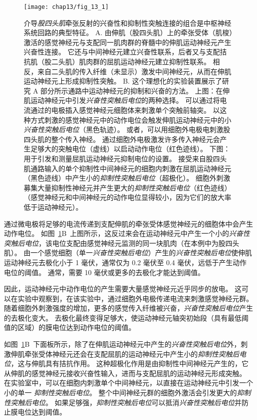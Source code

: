 \begin{figure}[htbp]
	\centering
	\texttt{[image: chap13/fig\_13\_1]}
	\caption{介导\textit{股四头肌}牵张反射的兴奋性和抑制性突触连接的组合是中枢神经系统回路的典型特征。
		A. 由伸肌（股四头肌）上的牵张受体（肌梭）激活的感觉神经元与支配同一肌肉群的脊髓中的伸肌运动神经元产生兴奋性连接。
		它还与中间神经元建立兴奋性联系，后者又与支配拮抗肌（股二头肌）肌肉群的屈肌运动神经元建立抑制性联系。
		相反，来自二头肌的传入纤维（未显示）激发中间神经元，从而在伸肌运动神经元上形成抑制性突触。
		B. 这个理想化的实验装置展示了研究 A 部分所示通路中运动神经元的抑制和兴奋的方法。
		上图：在伸肌运动神经元中引发\textit{兴奋性突触后电位}的两种选择。
		可以通过将电流通过的电极插入感觉神经元细胞体来刺激单个突触前轴突。
		以这种方式刺激的感觉神经元中的动作电位会触发伸肌运动神经元中的小\textit{兴奋性突触后电位}（黑色轨迹）。
		或者，可以用细胞外电极电刺激股四头肌的整个传入神经。
		通过细胞外电极激发许多传入神经元会产生足够大的突触电位（虚线）以启动动作电位（红色迹线）。
		下图：用于引发和测量屈肌运动神经元抑制电位的设置。
		接受来自股四头肌通路输入的单个抑制性中间神经元的细胞内刺激在屈肌运动神经元（黑色迹线）中产生小的\textit{抑制性突触后电位}（超极化）。
		细胞外刺激募集大量抑制性神经元并产生更大的\textit{抑制性突触后电位}（红色迹线）
		（感觉神经元和中间神经元的动作电位显得较小，因为它们的放大率低于运动神经元）。}
	\label{fig:13_1}
\end{figure}


通过微电极将足够的电流传递到支配伸肌的牵张受体感觉神经元的细胞体中会产生动作电位。
如图~\ref{fig:13_1}B~上图所示，这反过来会在运动神经元中产生一个小的\textit{兴奋性突触后电位}，该电位支配由感觉神经元监测的同一块肌肉（在本例中为股四头肌）。
由一个感觉细胞（单一\textit{兴奋性突触后电位}）产生的\textit{兴奋性突触后电位}使伸肌运动神经元去极化小于 1 毫伏，通常仅为 0.2 毫伏至 0.4 毫伏，远低于产生动作电位的阈值。
通常，需要 10 毫伏或更多的去极化才能达到阈值。


因此，运动神经元中动作电位的产生需要大量感觉神经元近乎同步的放电。
这可以在实验中观察到，在该实验中，通过细胞外电极传递电流来刺激感觉神经元群。
随着细胞外刺激强度的增加，更多的感觉传入纤维被兴奋，\textit{兴奋性突触后电位}产生的去极化变大。
去极化最终变得足够大，使运动神经元轴突初始段（具有最低阈值的区域）的膜电位达到动作电位的阈值。


如图~\ref{fig:13_1}B~下面板所示，除了在伸肌运动神经元中产生的\textit{兴奋性突触后电位}外，刺激伸肌牵张受体神经元还会在支配屈肌的运动神经元中产生小的\textit{抑制性突触后电位}，这与伸肌具有拮抗作用。
这种超极化作用是由抑制性中间神经元产生的，它从伸肌的感觉神经元接收兴奋性输入，进而与支配屈肌的运动神经元形成突触。
在实验室中，可以在细胞内刺激单个中间神经元，以直接在运动神经元中引发一个小的单一 \textit{抑制性突触后电位}。
整个中间神经元群的细胞外激活会引发更大的\textit{抑制性突触后电位}。
如果足够强，\textit{抑制性突触后电位}可以抵消\textit{兴奋性突触后电位}并防止膜电位达到阈值。



